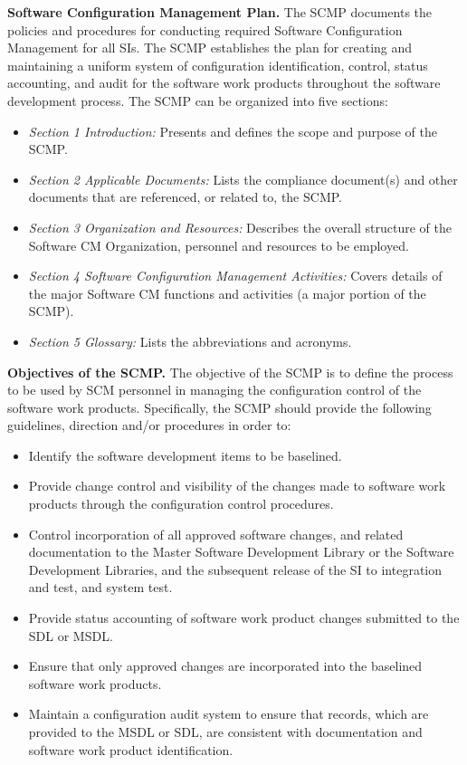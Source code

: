 \documentclass[8pt,twocolumn]{amsart}
\theoremstyle{plain}
\begin{document}
{\bf Software Configuration Management Plan.} The SCMP documents the policies and procedures for conducting required Software Configuration Management for all
SIs. The SCMP establishes the plan for creating and maintaining a uniform system of configuration identification, control, status accounting, and audit for the software work products throughout the software development process. The SCMP can be organized into five sections:
\begin{itemize}
\item {\em Section 1 Introduction:} Presents and defines the scope and purpose of the SCMP.
\item {\em Section 2 Applicable Documents:} Lists the compliance document(s) and other documents that are referenced, or related to, the SCMP.
\item {\em Section 3 Organization and Resources:} Describes the overall structure of the Software CM Organization, personnel and resources to be employed.
\item {\em Section 4 Software Configuration Management Activities:} Covers details of the major Software CM functions and activities (a major portion of the SCMP).
\item {\em Section 5 Glossary:} Lists the abbreviations and acronyms.
\end{itemize}

{\bf Objectives of the SCMP.} The objective of the SCMP is to define the process to be used by SCM personnel in managing the configuration control of the software work products. Specifically, the SCMP should provide the following guidelines, direction and/or procedures in order to:

\begin{itemize}
\item Identify the software development items to be baselined.
\item Provide change control and visibility of the changes made to software work products through the configuration control procedures.
\item Control incorporation of all approved software changes,
and related documentation to the Master Software Development Library or the Software Development Libraries, and the subsequent release of the SI to integration and test, and system test.
\item Provide status accounting of software work product changes submitted to the SDL or MSDL.
\item Ensure that only approved changes are incorporated into the baselined software work products.
\item Maintain a configuration audit system to ensure that records, which are provided to the MSDL or SDL, are consistent with documentation and software work product identification.
\end{itemize}
\end{document}
